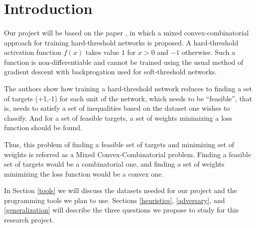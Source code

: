 \section{Introduction}
\paragraph{}
Our project will be based on the paper \cite{Friesen}, in which a mixed convex-combinatorial approach for training hard-threshold networks is proposed. A hard-threshold activation function $f(x)$ takes value $1$ for $x > 0$ and $-1$ otherwise. Such a function is non-differentiable and cannot be trained using the usual method of gradient descent with backprogation used for soft-threshold networks.

The authors show how training a hard-threshold network reduces to finding a set of targets (+1,-1) for each unit of the network, which needs to be ``feasible'', that is, needs to satisfy a set of inequalities based on the dataset one wishes to classify. And for a set of feasible targets, a set of weights minimizing a loss function should be found.

Thus, this problem of finding a feasible set of targets and minimizing set of weights is referred as a Mixed Convex-Combinatorial problem. Finding a feasible set of targets would be a combinatorial one, and finding a set of weights minimizing the loss function would be a convex one.

In Section \ref{tools} we will discuss the datasets needed for our project and the programming tools we plan to use. Sections \ref{heuristics}, \ref{adversary}, and \ref{generalization} will describe the three questions we propose to study for this research project.